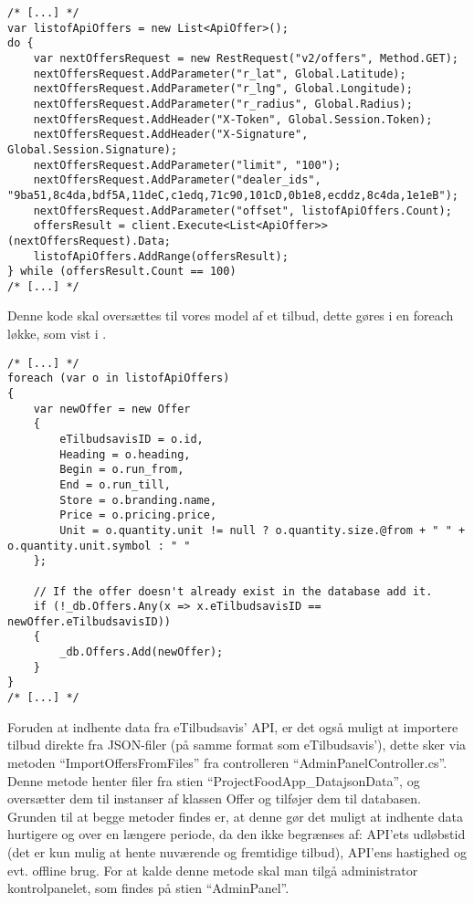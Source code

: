 \begin{lstlisting}[caption="C\#-kode som anvender ``/v2/offers'' delen af API'et til at hente tilbud.", label=apiofferscs]
/* [...] */
var listofApiOffers = new List<ApiOffer>();
do {
    var nextOffersRequest = new RestRequest("v2/offers", Method.GET);
    nextOffersRequest.AddParameter("r_lat", Global.Latitude);
    nextOffersRequest.AddParameter("r_lng", Global.Longitude);
    nextOffersRequest.AddParameter("r_radius", Global.Radius);
    nextOffersRequest.AddHeader("X-Token", Global.Session.Token);
    nextOffersRequest.AddHeader("X-Signature", Global.Session.Signature);
    nextOffersRequest.AddParameter("limit", "100");
    nextOffersRequest.AddParameter("dealer_ids", "9ba51,8c4da,bdf5A,11deC,c1edq,71c90,101cD,0b1e8,ecddz,8c4da,1e1eB");
    nextOffersRequest.AddParameter("offset", listofApiOffers.Count);
    offersResult = client.Execute<List<ApiOffer>>(nextOffersRequest).Data;
    listofApiOffers.AddRange(offersResult);
} while (offersResult.Count == 100)
/* [...] */
\end{lstlisting}

Denne kode skal oversættes til vores model af et tilbud, dette gøres i en foreach løkke, som vist i .

\begin{lstlisting}[caption="C\#-kode som bruger API-data til at oprette instancer af Offer-klassen\, og tilføjer dem til databasen", label=apiofferstooffercs]
/* [...] */
foreach (var o in listofApiOffers)
{
    var newOffer = new Offer
    {
        eTilbudsavisID = o.id,
        Heading = o.heading,
        Begin = o.run_from,
        End = o.run_till,
        Store = o.branding.name,
        Price = o.pricing.price,
        Unit = o.quantity.unit != null ? o.quantity.size.@from + " " + o.quantity.unit.symbol : " "
    };

    // If the offer doesn't already exist in the database add it.
    if (!_db.Offers.Any(x => x.eTilbudsavisID == newOffer.eTilbudsavisID))
    {
        _db.Offers.Add(newOffer);
    }
}
/* [...] */
\end{lstlisting}

Foruden at indhente data fra eTilbudsavis' API, er det også muligt at importere tilbud direkte fra JSON-filer (på samme format som eTilbudsavis'), dette sker via metoden ``ImportOffersFromFiles'' fra controlleren ``AdminPanelController.cs''. 
Denne metode henter filer fra stien ``ProjectFood\/App\_Data\/jsonData\/'', og oversætter dem til instanser af klassen Offer og tilføjer dem til databasen. 
Grunden til at begge metoder findes er, at denne gør det muligt at indhente data hurtigere og over en længere periode, da den ikke begrænses af: API'ets udløbstid (det er kun mulig at hente nuværende og fremtidige tilbud), API'ens hastighed og evt. offline brug. 
For at kalde denne metode skal man tilgå administrator kontrolpanelet, som findes på stien ``\/AdminPanel''.

